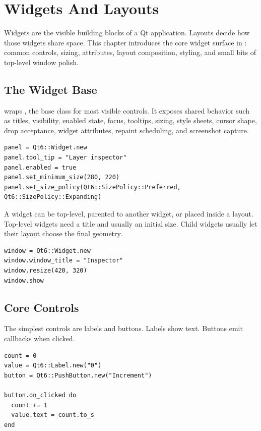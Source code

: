 \chapter{Widgets And Layouts}

Widgets are the visible building blocks of a Qt application. Layouts decide how those widgets share space. This chapter introduces the core widget surface in : common controls, sizing, attributes, layout composition, styling, and small bits of top-level window polish.

\section{The Widget Base}

 wraps , the base class for most visible controls. It exposes shared behavior such as titles, visibility, enabled state, focus, tooltips, sizing, style sheets, cursor shape, drop acceptance, widget attributes, repaint scheduling, and screenshot capture.

\begin{lstlisting}[style=crystal]
panel = Qt6::Widget.new
panel.tool_tip = "Layer inspector"
panel.enabled = true
panel.set_minimum_size(280, 220)
panel.set_size_policy(Qt6::SizePolicy::Preferred, Qt6::SizePolicy::Expanding)
\end{lstlisting}

A widget can be top-level, parented to another widget, or placed inside a layout. Top-level widgets need a title and usually an initial size. Child widgets usually let their layout choose the final geometry.

\begin{lstlisting}[style=crystal]
window = Qt6::Widget.new
window.window_title = "Inspector"
window.resize(420, 320)
window.show
\end{lstlisting}

\section{Core Controls}

The simplest controls are labels and buttons. Labels show text. Buttons emit callbacks when clicked.

\begin{lstlisting}[style=crystal]
count = 0
value = Qt6::Label.new("0")
button = Qt6::PushButton.new("Increment")

button.on_clicked do
  count += 1
  value.text = count.to_s
end
\end{lstlisting}

